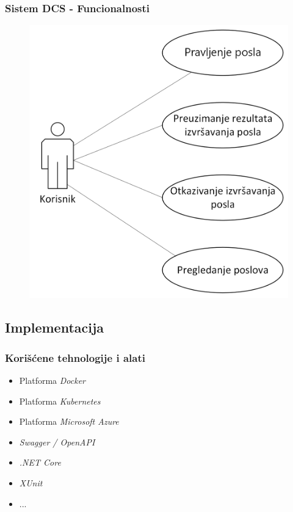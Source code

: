 \documentclass[11pt]{beamer}
\begin{document}
\begin{frame}
	\frametitle{Sistem DCS - Funcionalnosti}

	\begin{figure}
		\includegraphics[width=0.55\linewidth]{./images/dijagram_slucajeva_upotrebe_korisnik.png}
	\end{figure}
	
\end{frame}


\subsection{Implementacija}

\begin{frame}
	\frametitle{Korišćene tehnologije i alati}

	\begin{itemize}
		\item Platforma \emph{Docker}
		\item Platforma \emph{Kubernetes}
		\item Platforma \emph{Microsoft Azure}
		\item \emph{Swagger / OpenAPI}
		\item \emph{.NET Core}
		\item \emph{XUnit}
		\item ...
	\end{itemize}

\end{frame}

\end{document}
